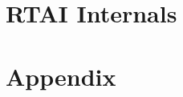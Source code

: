\documentclass[10pt,a4paper,pointlessnumbers,bibtotocnumbered,headsepline]{scrbook}
\begin{document}
\part{RTAI Internals}





\appendix
\part{Appendix}

\begin{thebibliography}{99}
%
%
%
\end{thebibliography}
%
%

\printindex
\end{document}
